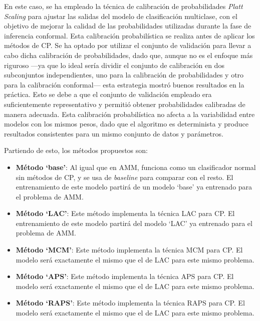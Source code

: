 En este caso, se ha empleado la técnica de calibración de probabilidades \textit{Platt Scaling} para ajustar las salidas del modelo de clasificación multiclase, con el objetivo de mejorar la calidad de las probabilidades utilizadas durante la fase de inferencia conformal. Esta calibración probabilística se realiza antes de aplicar los métodos de CP. Se ha optado por utilizar el conjunto de validación para llevar a cabo dicha calibración de probabilidades, dado que, aunque no es el enfoque más riguroso ---ya que lo ideal sería dividir el conjunto de calibración en dos subconjuntos independientes, uno para la calibración de probabilidades y otro para la calibración conformal--- esta estrategia mostró buenos resultados en la práctica. Esto se debe a que el conjunto de validación empleado era suficientemente representativo y permitió obtener probabilidades calibradas de manera adecuada. Esta calibración probabilística no afecta a la variabilidad entre modelos con los mismos pesos, dado que el algoritmo es determinista y produce resultados consistentes para un mismo conjunto de datos y parámetros. 

Partiendo de esto, los métodos propuestos son:

\begin{itemize}

\item \textbf{Método `base'}: Al igual que en AMM, funciona como un clasificador normal sin métodos de CP, y se usa de \textit{baseline} para comparar con el resto. El entrenamiento de este modelo partirá de un modelo `base' ya entrenado para el problema de AMM.

\item \textbf{Método `LAC'}: Este método implementa la técnica LAC para CP. El entrenamiento de este modelo partirá del modelo `LAC' ya entrenado para el problema de AMM.

\item \textbf{Método `MCM'}: Este método implementa la técnica MCM para CP. El modelo será exactamente el mismo que el de LAC para este mismo problema. 

\item \textbf{Método `APS'}: Este método implementa la técnica APS para CP. El modelo será exactamente el mismo que el de LAC para este mismo problema.

\item \textbf{Método `RAPS'}: Este método implementa la técnica RAPS para CP. El modelo será exactamente el mismo que el de LAC para este mismo problema. 

\end{itemize} 

